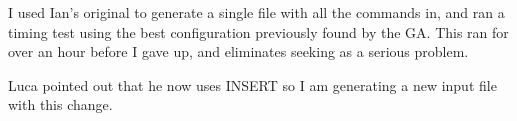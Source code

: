 I used Ian's original  to generate a single file with all the commands in,
and ran a timing test using the best configuration previously found by the GA.
This ran for over an hour before I gave up, and eliminates seeking as a serious problem.

Luca pointed out that he now uses INSERT so I am generating a new input file with this change.

